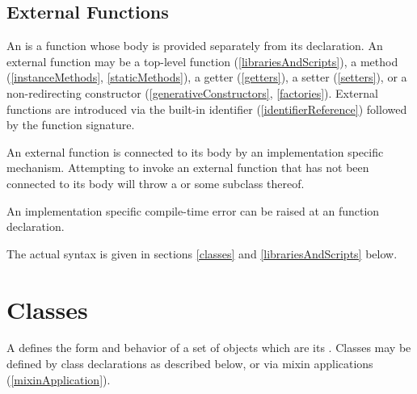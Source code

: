 \documentclass[makeidx]{article}
\begin{document}
\subsection{External Functions}

\LMHash{}%
An 
is a function whose body is provided separately from its declaration.
An external function may be
a top-level function (\ref{librariesAndScripts}),
a method (\ref{instanceMethods}, \ref{staticMethods}),
a getter (\ref{getters}),
a setter (\ref{setters}),
or a non-redirecting constructor
(\ref{generativeConstructors}, \ref{factories}).
External functions are introduced via the built-in identifier \EXTERNAL{}
(\ref{identifierReference})
followed by the function signature.



\LMHash{}%
An external function is connected to its body by
an implementation specific mechanism.
Attempting to invoke an external function
that has not been connected to its body
will throw a  or some subclass thereof.

\LMHash{}%
An implementation specific compile-time error can be raised
at an \EXTERNAL{} function declaration.


\LMHash{}%
The actual syntax is given in
sections \ref{classes} and \ref{librariesAndScripts} below.


\section{Classes}

\LMHash{}%
A  defines the form and behavior of a set of objects which are its
.
Classes may be defined by class declarations as described below,
or via mixin applications (\ref{mixinApplication}).
\end{document}
